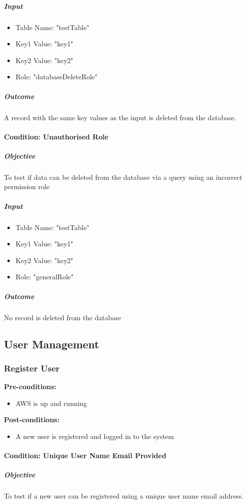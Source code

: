 \documentclass{article}
\begin{document}
				\subparagraph{Input}
				\begin{itemize}
					\item Table Name: "testTable"
					\item Key1 Value: "key1"
					\item Key2 Value: "key2"
					\item Role: "databaseDeleteRole"
				\end{itemize}
				
				\subparagraph{Outcome}
					A record with the same key values as the input is deleted from the database.
				
				\paragraph{Condition: Unauthorised Role}
				\subparagraph{Objective}
					To test if data can be deleted from the database via a query using an incorrect permission role
				
				\subparagraph{Input}
				\begin{itemize}
					\item Table Name: "testTable"
					\item Key1 Value: "key1"
					\item Key2 Value: "key2"
					\item Role: "generalRole"
				\end{itemize}
				
				\subparagraph{Outcome}
				No record is deleted from the database
	
	\subsection{User Management}
		\subsubsection{Register User}
			\textbf{Pre-conditions:}
			\begin{itemize}
				\item AWS is up and running
			\end{itemize}
			\textbf{Post-conditions:}
			\begin{itemize}
				\item A new user is registered and logged in to the system
			\end{itemize}
			
			\paragraph{Condition: Unique User Name Email Provided}
			\subparagraph{Objective}
				To test if a new user can be registered using a unique user name email address.
				
\end{document}
